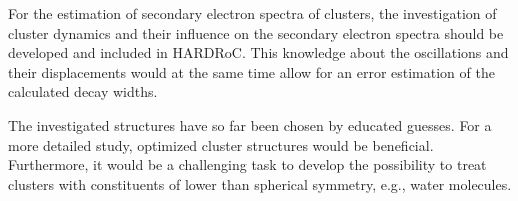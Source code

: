 For the estimation of secondary electron spectra of clusters,
the investigation of cluster dynamics and their influence on the
secondary electron spectra should be developed and included in
HARDRoC. This knowledge about the oscillations and their displacements
would at the same time allow for an error estimation of
the calculated decay widths.

The investigated structures have so far been chosen by educated guesses.
For a more detailed study, optimized cluster structures would be beneficial.
Furthermore, it would be a challenging task to develop the possibility to
treat clusters with constituents of lower than spherical symmetry, e.g.,
water molecules.
